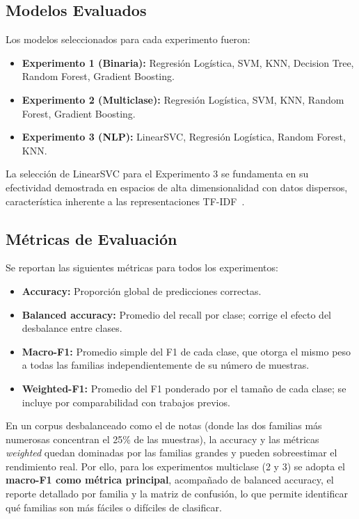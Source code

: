 \subsection{Modelos Evaluados}

Los modelos seleccionados para cada experimento fueron:

\begin{itemize}
    \item \textbf{Experimento 1 (Binaria):} Regresión Logística, SVM, KNN, Decision Tree, Random Forest, Gradient Boosting.
    \item \textbf{Experimento 2 (Multiclase):} Regresión Logística, SVM, KNN, Random Forest, Gradient Boosting.
    \item \textbf{Experimento 3 (NLP):} LinearSVC, Regresión Logística, Random Forest, KNN.
\end{itemize}

La selección de LinearSVC para el Experimento 3 se fundamenta en su efectividad demostrada en espacios de alta dimensionalidad con datos dispersos, característica inherente a las representaciones TF-IDF~\cite{joachims1998}.

\subsection{Métricas de Evaluación}

Se reportan las siguientes métricas para todos los experimentos:

\begin{itemize}
    \item \textbf{Accuracy:} Proporción global de predicciones correctas.
    \item \textbf{Balanced accuracy:} Promedio del recall por clase; corrige el efecto del desbalance entre clases.
    \item \textbf{Macro-F1:} Promedio simple del F1 de cada clase, que otorga el mismo peso a todas las familias independientemente de su número de muestras.
    \item \textbf{Weighted-F1:} Promedio del F1 ponderado por el tamaño de cada clase; se incluye por comparabilidad con trabajos previos.
\end{itemize}

En un corpus desbalanceado como el de notas (donde las dos familias más numerosas concentran el 25\% de las muestras), la accuracy y las métricas \textit{weighted} quedan dominadas por las familias grandes y pueden sobreestimar el rendimiento real. Por ello, para los experimentos multiclase (2 y 3) se adopta el \textbf{macro-F1 como métrica principal}, acompañado de balanced accuracy, el reporte detallado por familia y la matriz de confusión, lo que permite identificar qué familias son más fáciles o difíciles de clasificar.

